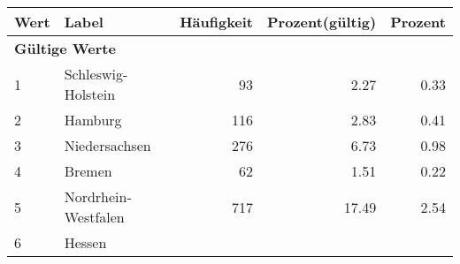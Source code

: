      \begin{longtable}{lXrrr}
     \toprule
     \textbf{Wert} & \textbf{Label} & \textbf{Häufigkeit} & \textbf{Prozent(gültig)} & \textbf{Prozent} \\
     \endhead
     \midrule
     \multicolumn{5}{l}{\textbf{Gültige Werte}}\\

     1 &
     \multicolumn{1}{X}{ Schleswig-Holstein   } &


       \num{93} &
       \num[round-mode=places,round-precision=2]{2.27} &
         \num[round-mode=places,round-precision=2]{0.33} \\

     2 &
     \multicolumn{1}{X}{ Hamburg   } &


       \num{116} &
       \num[round-mode=places,round-precision=2]{2.83} &
         \num[round-mode=places,round-precision=2]{0.41} \\

     3 &
     \multicolumn{1}{X}{ Niedersachsen   } &


       \num{276} &
       \num[round-mode=places,round-precision=2]{6.73} &
         \num[round-mode=places,round-precision=2]{0.98} \\

     4 &
     \multicolumn{1}{X}{ Bremen   } &


       \num{62} &
       \num[round-mode=places,round-precision=2]{1.51} &
         \num[round-mode=places,round-precision=2]{0.22} \\

     5 &
     \multicolumn{1}{X}{ Nordrhein-Westfalen   } &


       \num{717} &
       \num[round-mode=places,round-precision=2]{17.49} &
         \num[round-mode=places,round-precision=2]{2.54} \\

     6 &
     \multicolumn{1}{X}{ Hessen   } &



\end{longtable}
